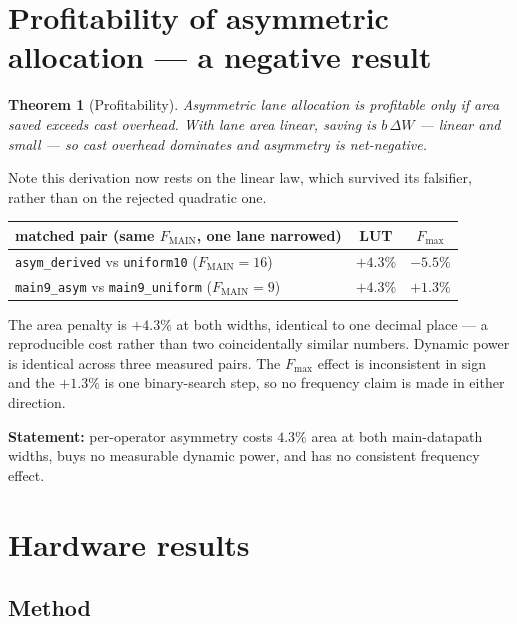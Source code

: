 \documentclass[11pt,a4paper]{article}
\newtheorem{theorem}{Theorem}
\begin{document}
\section{Profitability of asymmetric allocation --- a negative result}

\begin{theorem}[Profitability]
Asymmetric lane allocation is profitable only if area saved exceeds cast
overhead. With lane area linear, saving is $b\,\Delta W$ --- linear and small
--- so cast overhead dominates and asymmetry is net-negative.
\end{theorem}

Note this derivation now rests on the linear law, which survived its falsifier,
rather than on the rejected quadratic one.

\begin{table}[h]\centering
\begin{tabular}{lcc}
\toprule
matched pair (same $F_{\text{MAIN}}$, one lane narrowed) & LUT & $F_{\max}$ \\
\midrule
\texttt{asym\_derived} vs \texttt{uniform10} ($F_{\text{MAIN}}\!=\!16$)
  & $+4.3\%$ & $-5.5\%$ \\
\texttt{main9\_asym} vs \texttt{main9\_uniform} ($F_{\text{MAIN}}\!=\!9$)
  & $+4.3\%$ & $+1.3\%$ \\
\bottomrule
\end{tabular}
\end{table}

The area penalty is $+4.3\%$ at both widths, identical to one decimal place ---
a reproducible cost rather than two coincidentally similar numbers. Dynamic
power is identical across three measured pairs. The $F_{\max}$ effect is
inconsistent in sign and the $+1.3\%$ is one binary-search step, so no
frequency claim is made in either direction.

\textbf{Statement:} per-operator asymmetry costs $4.3\%$ area at both
main-datapath widths, buys no measurable dynamic power, and has no consistent
frequency effect.

\section{Hardware results}

\subsection{Method}
\end{document}
